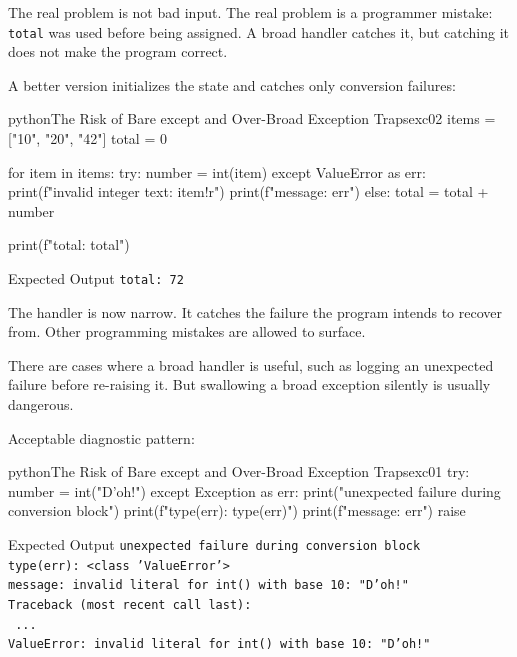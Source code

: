 \documentclass[a4paper,twoside]{report}
\begin{document}
The real problem is not bad input. The real problem is a programmer mistake: \texttt{total} was used before being assigned. A broad handler catches it, but catching it does not make the program correct.

A better version initializes the state and catches only conversion failures:

\begin{codebox}[]{python}{The Risk of Bare except and Over-Broad Exception Traps}{exc02}
items = ["10", "20", "42"]
total = 0

for item in items:
    try:
        number = int(item)
    except ValueError as err:
        print(f"invalid integer text: {item!r}")
        print(f"message: {err}")
    else:
        total = total + number

print(f"total: {total}")
\end{codebox}


\begin{iobox}{Expected Output}
\texttt{total: 72} \\
\end{iobox}


The handler is now narrow. It catches the failure the program intends to recover from. Other programming mistakes are allowed to surface.

There are cases where a broad handler is useful, such as logging an unexpected failure before re-raising it. But swallowing a broad exception silently is usually dangerous.

Acceptable diagnostic pattern:

\begin{codebox}[]{python}{The Risk of Bare except and Over-Broad Exception Traps}{exc01}
try:
    number = int("D'oh!")
except Exception as err:
    print("unexpected failure during conversion block")
    print(f"type(err): {type(err)}")
    print(f"message: {err}")
    raise
\end{codebox}


\begin{iobox}{Expected Output}
\texttt{unexpected failure during conversion block} \\
\texttt{type(err): <class 'ValueError'>} \\
\texttt{message: invalid literal for int() with base 10: "D'oh!"} \\
\texttt{Traceback (most recent call last):} \\
\texttt{  ...} \\
\texttt{ValueError: invalid literal for int() with base 10: "D'oh!"} \\
\end{iobox}
\end{document}
